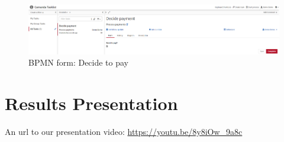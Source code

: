 \begin{landscape}
        \begin{figure}[h]\centering
            \includegraphics[width=22cm]{pic/camunda4}
            \caption{BPMN form: Decide to pay}
            \label{fig:camunda4}
        \end{figure}
    
    \end{landscape}

\section{Results Presentation}\label{sec:presentation}

An url to our presentation video: \url{https://youtu.be/8y8iOw_9a8c}
